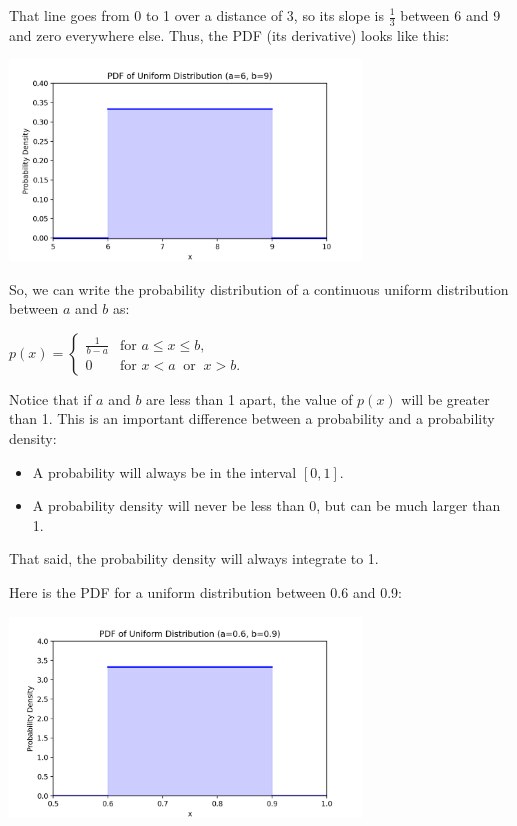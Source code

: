 That line goes from 0 to 1 over a distance of 3, so its slope is $\frac{1}{3}$ between 6 and  9 and zero everywhere else. Thus, the PDF (its derivative) looks like this:

\includegraphics[width=0.7\textwidth]{unif_pdf.png}

So, we can write the probability distribution of a continuous uniform distribution between $a$ and $b$ as:

  $p(x) = \begin{cases}
  \frac{1}{b-a} & \text{for } a \le x \le b, \\[8pt]
  0 & \text{for } x < a \ \text{ or } \ x > b.
  \end{cases}$

Notice that if $a$ and $b$ are less than 1 apart,  the value of $p(x)$ will be greater than 1.  This is an important difference between a probability and a probability density: 
\begin{itemize}
\item A probability will always be in the interval $[0, 1]$.  
\item A probability density will never be less than 0,  but can be much larger than 1.
\end{itemize}

That said,  the probability density will always integrate to 1.

Here is the PDF for a uniform distribution between 0.6 and 0.9:

\includegraphics[width=0.7\textwidth]{unif_pdf2.png}

